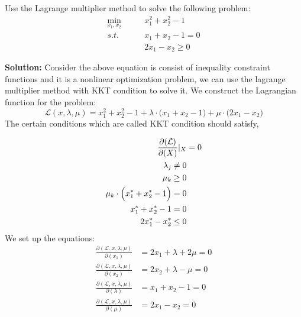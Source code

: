 \documentclass[a4paper]{article}
\begin{document}
Use the Lagrange multiplier method to solve the following problem:
\begin{equation}
    \begin{aligned}
        \min_{x_1, x_2}    \qquad& x_{1}^{2} + x_{2}^{2} - 1 \\
        s.t.\qquad & x_{1} + x_{2} - 1 =0 \\
        & 2x_{1} - x_{2} \ge 0
    \end{aligned}
\end{equation}    

\textbf{Solution:} Consider the above equation is consist of inequality constraint functions and it is a nonlinear optimization problem, we can use the lagrange multiplier method with KKT condition to solve it. We construct the Lagrangian function for the problem:
\begin{equation}
    \mathcal{L}(x,\lambda, \mu) = x_{1}^{2} + x_{2}^{2} - 1 + \lambda \cdot \Big(x_{1} + x_{2} - 1\Big) + \mu \cdot \Big(2x_{1} - x_{2}\Big)
\end{equation}    
The certain conditions which are called KKT condition should satisfy,

\begin{equation}
    \begin{aligned}
        \frac{\partial(\mathcal{L})}{\partial(X)}\arrowvert_{X} &=0\\
        \lambda_{j}  \ne 0 \\
        \mu_{k}  \ge 0\\
        \mu_{k} \cdot \Big(x_{1}^{*} + x_{2}^{*} - 1\Big) =0\\
        x_{1}^{*} + x_{2}^{*} - 1 = 0\\
        2x_{1}^{*}  - x_{2}^{*}  \le 0\\
    \end{aligned}
\end{equation}  
We set up the equations:
\begin{equation}
    \begin{aligned}
        \frac{\partial(\mathcal{L},x,\lambda, \mu)}{\partial(x_1)} &=2 x_1 + \lambda +2 \mu = 0\\
        \frac{\partial(\mathcal{L},x,\lambda, \mu)}{\partial(x_2)} &=2 x_2 + \lambda - \mu = 0\\
        \frac{\partial(\mathcal{L},x,\lambda, \mu)}{\partial(\lambda)} &= x_1 + x_2 -1  = 0\\
        \frac{\partial(\mathcal{L},x,\lambda, \mu)}{\partial(\mu)} &= 2 x_1 - x_2 = 0\\
    \end{aligned}
\end{equation} 
\end{document}
